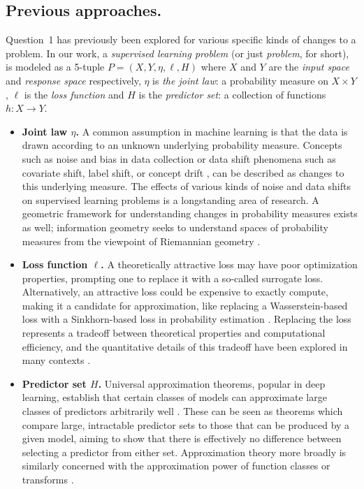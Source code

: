 \documentclass[twoside,11pt]{article}
\begin{document}
\subsection{Previous approaches.}
Question~1 has previously been explored for various specific kinds of changes to a problem. In our work, a \emph{supervised learning problem} (or just \emph{problem},   for short), is modeled as a 5-tuple $P=(X,Y,\eta,\ell,H)$ where $X$ and $Y$ are the \emph{input space} and \emph{response space} respectively, $\eta$ is \emph{the joint law}: a probability measure on $X\times Y$, $\ell$ is the \emph{loss function} and $H$ is the \emph{predictor set}: a collection of functions $h:X\to Y$.


\begin{itemize}
    \item \textbf{Joint law $\eta$.} A common assumption in machine learning is that the data is drawn according to an unknown underlying probability measure. Concepts such as noise and bias in data collection or data shift phenomena such as covariate shift, label shift, or concept drift \citep[Ch 8]{huyen_designing}, can be described as changes to this underlying measure. The effects of various kinds of noise \citep{zhu_class_2004, natarajan_learning_2013, menon_learning_2015, menon_learning_2018, rooyen_theory_2018, iacovissi_general_2023} and data shifts \citep{shimodaira_improving_2000}
    on supervised learning problems is a longstanding area of research. A geometric framework for understanding changes in probability measures exists as well; information geometry seeks to understand spaces of probability measures from the viewpoint of Riemannian geometry \citep{amari_information_2016, ay_information_2017}.
    \item \textbf{Loss function $\ell$.} A theoretically attractive loss may have poor optimization properties, prompting one to replace it with a so-called surrogate loss. Alternatively, an attractive loss could be expensive to exactly compute, making it a candidate for approximation, like replacing a Wasserstein-based loss with a Sinkhorn-based loss in probability estimation \citep{cuturi_sinkhorn_2013}. Replacing the loss represents a tradeoff between theoretical properties and computational efficiency, and the quantitative details of this tradeoff have been explored in many contexts \citep{lin_note_2004,zhang_statistical_2004,bartlett_convexity_2006,steinwart_how_2007,awasthi_h-consistency_2022,mao_cross-entropy_2023}.
    \item \textbf{Predictor set $H$.} Universal approximation theorems, popular in deep learning, establish that certain classes of models can approximate large classes of predictors arbitrarily well \citep{pinkus_approximation_1999}. These can be seen as theorems which compare large, intractable predictor sets to those that can be produced by a given model, aiming to show that there is effectively no difference between selecting a predictor from either set. Approximation theory more broadly is similarly concerned with the approximation power of function classes or transforms \citep{trefethen_approximation_2019}.

\end{itemize}
\end{document}
